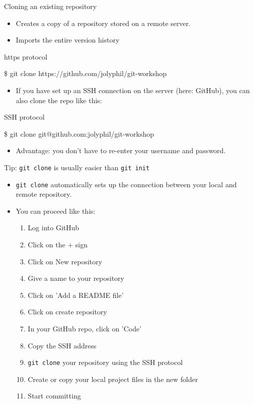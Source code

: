\documentclass[handout]{beamer}
\begin{document}
\begin{frame}{Cloning an existing repository}
	\begin{itemize}
		\item Creates a copy of a repository stored on a remote server. 
		\item Imports the entire version history
	\end{itemize}
	\begin{exampleblock}{https protocol}
		\begin{semiverbatim}
			\item \$ git clone https://github.com/jolyphil/git-workshop
		\end{semiverbatim}
	\end{exampleblock}
	\begin{itemize}
		\item If you have set up an SSH connection on the server (here: GitHub), you can also clone the repo like this: 
	\end{itemize}
	\begin{exampleblock}{SSH protocol}
		\begin{semiverbatim}
			\item \$ git clone git@github.com:jolyphil/git-workshop
		\end{semiverbatim}
	\end{exampleblock}
	\begin{itemize}
		\item Advantage: you don't have to re-enter your username and password. 
	\end{itemize}
\end{frame}

\begin{frame}{Tip: \texttt{git clone} is usually easier than \texttt{git init}}
	\begin{itemize}
		\item \texttt{git clone} automatically sets up the connection between your local and remote repository. 
		\item You can proceed like this:
		\begin{enumerate}
			\item Log into GitHub
			\item Click on the + sign
			\item Click on New repository
			\item Give a name to your repository
			\item Click on 'Add a README file' 
			\item Click on create repository
			\item In your GitHub repo, click on 'Code'
			\item Copy the SSH address
			\item \texttt{git clone} your repository using the SSH protocol
			\item Create or copy your local project files in the new folder
			\item Start committing
		\end{enumerate}
	\end{itemize}
\end{frame}
\end{document}

